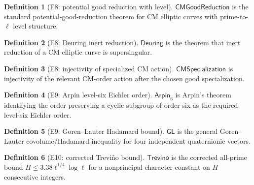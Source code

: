 \documentclass[11pt,a4paper]{article}
\numberwithin{equation}{section}
\theoremstyle{plain}\newtheorem{theorem}{Theorem}[section]\newaliascnt{proposition}{theorem}\newtheorem{proposition}[proposition]{Proposition}\aliascntresetthe{proposition}\newaliascnt{lemma}{theorem}\newtheorem{lemma}[lemma]{Lemma}\aliascntresetthe{lemma}
\theoremstyle{definition}\newaliascnt{definition}{theorem}\newtheorem{definition}[definition]{Definition}\aliascntresetthe{definition}\newaliascnt{notation}{theorem}\newtheorem{notation}[notation]{Notation}\aliascntresetthe{notation}
\providecommand{\lean}[1]{}\providecommand{\leanok}{}
\begin{document}
\begin{definition}[E8: potential good reduction with level]\label{def_ext_cm_good_reduction}\lean{SptCM.RolenLiterature.CMPotentialGoodReduction}\leanok
$\mathsf{CMGoodReduction}$ is the standard potential-good-reduction theorem for CM elliptic curves with prime-to-$\ell$ level structure.
\end{definition}
\begin{definition}[E8: Deuring inert reduction]\label{def_ext_deuring}\lean{SptCM.RolenLiterature.DeuringInertSupersingular}\leanok
$\mathsf{Deuring}$ is the theorem that inert reduction of a CM elliptic curve is supersingular.
\end{definition}
\begin{definition}[E8: injectivity of specialized CM action]\label{def_ext_cm_specialization_injective}\lean{SptCM.RolenLiterature.CMSpecializationInjective}\leanok
$\mathsf{CMSpecialization}$ is injectivity of the relevant CM-order action after the chosen good specialization.
\end{definition}

\begin{definition}[E9: Arpin level-six Eichler order]\label{def_ext_arpin}\lean{SptCM.RolenLiterature.ArpinLevelSix}\leanok
$\mathsf{Arpin}_6$ is Arpin's theorem identifying the order preserving a cyclic subgroup of order six as the required level-six Eichler order.
\end{definition}
\begin{definition}[E9: Goren--Lauter Hadamard bound]\label{def_ext_goren_lauter}\lean{SptCM.RolenLiterature.GorenLauterHadamard}\leanok
$\mathsf{GL}$ is the general Goren--Lauter covolume/Hadamard inequality for four independent quaternionic vectors.
\end{definition}

\begin{definition}[E10: corrected Treviño bound]\label{def_ext_trevino}\lean{SptCM.RolenLiterature.E10TrevinoCorrected}\leanok
$\mathsf{Trevino}$ is the corrected all-prime bound $H\le3.38\ell^{1/4}\log\ell$ for a nonprincipal character constant on $H$ consecutive integers.
\end{definition}
\end{document}
